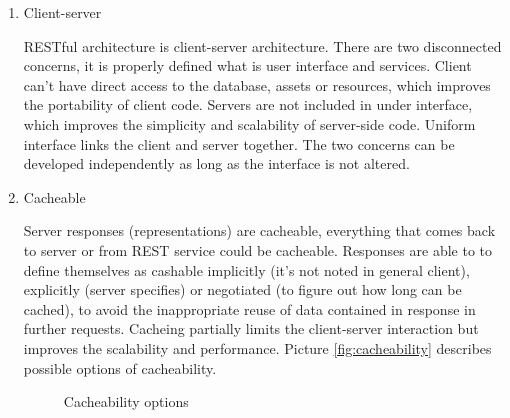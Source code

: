 \begin{description}
\begin{enumerate}
\item Client-server

RESTful architecture is client-server architecture. There are two disconnected concerns, it is properly defined what is user interface and services. Client can’t have direct access to the database, assets or resources, which improves the portability of client code. Servers are not included in under interface, which improves the simplicity and scalability of server-side code. Uniform interface links the client and server together. The two concerns can be developed independently as long as the interface is not altered. 

\item Cacheable

Server responses (representations) are cacheable, everything that comes back to server or from REST service could be cacheable. Responses are able to to define themselves as cashable implicitly (it’s not noted in general client), explicitly (server specifies) or negotiated (to figure out how long can be cached), to avoid the inappropriate reuse of data contained in response in further requests. Cacheing partially limits the client-server interaction but improves the scalability and performance. 
Picture \ref{fig:cacheability} describes possible options of cacheability.


\begin{figure}[htp] 
\caption{Cacheability options}
\label{fig:casheability}
\end{figure} 


\end{enumerate}
\end{description}
